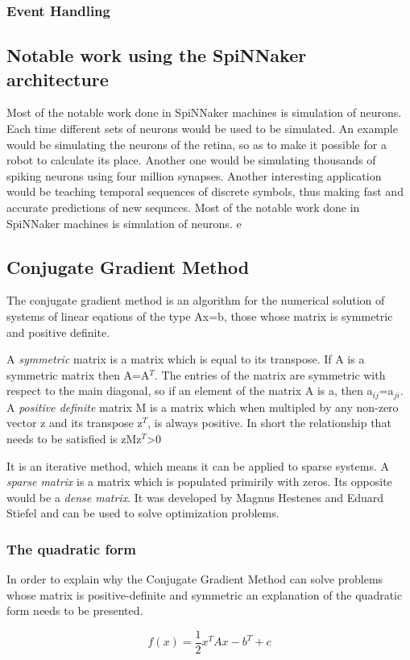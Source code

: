 \documentclass[12pt,a4paper]{article}
\begin{document}
\subsubsection{Event Handling}
\subsection{Notable work using the SpiNNaker architecture}
Most of the notable work done in SpiNNaker machines is simulation of neurons. Each time different sets of neurons would be used to be simulated. An example would be simulating the neurons of the retina, so as to make it possible for a robot to calculate its place\cite{davies2010interfacing}. Another one would be simulating thousands of spiking neurons using four million synapses\cite{sharp2012power}. Another interesting application would be teaching temporal sequences  of discrete symbols, thus making fast and accurate predictions of new sequnces\cite{bose2005spiking}.
Most of the notable work done in SpiNNaker machines is simulation of neurons. e
\subsection{Conjugate Gradient Method}
The conjugate gradient method is an algorithm for the numerical solution of systems of linear eqations of the type Ax=b, those whose matrix is symmetric and positive definite. 

A \emph{symmetric} matrix is a matrix which is equal to its transpose. If A is a symmetric matrix then A=A$^T$. The entries of the matrix are symmetric with respect to the main diagonal, so if an element of the matrix A is a, then a$_{ij}$=a$_{ji}$. 
A \emph{positive definite} matrix M is a matrix which when multipled by any non-zero vector z and its transpose z$^T$, is always positive. In short the relationship that needs to be satisfied is zMz$^T$>0

It is an iterative method, which means it can be applied to sparse systems. A \emph{sparse matrix} is a matrix which is populated primirily with zeros. Its opposite would be a \emph{dense matrix}. It was developed by Magnus Hestenes and Eduard Stiefel and can be used to solve optimization problems\cite{press2007numerical}.
\subsubsection{The quadratic form}
In order to explain why the Conjugate Gradient Method can solve problems whose matrix is positive-definite and symmetric an explanation of the quadratic form needs to be presented.
\begin{center}
\begin{equation}
f(x)=\frac{1}{2}x^TAx-b^T+c
\end{equation}
\end{center}
\end{document}
